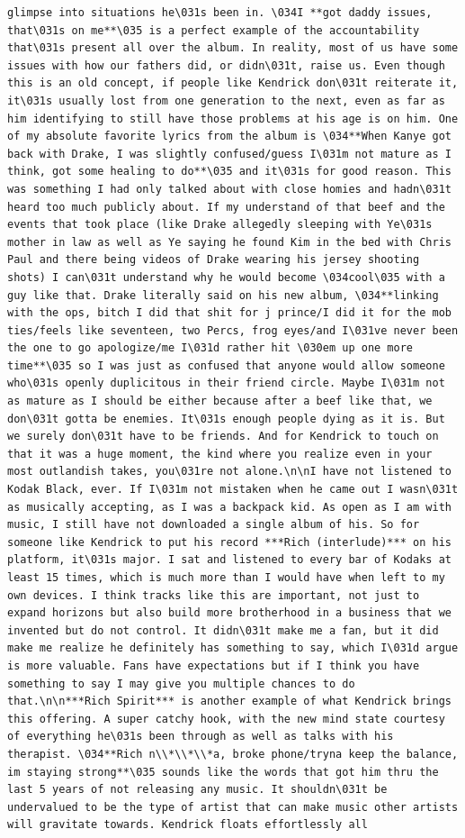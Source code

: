 \documentclass[
  letterpaper,
  DIV=11,
  numbers=noendperiod]{scrreprt}
\begin{document}
\begin{verbatim}
glimpse into situations he\031s been in. \034I **got daddy issues, that\031s on me**\035 is a perfect example of the accountability that\031s present all over the album. In reality, most of us have some issues with how our fathers did, or didn\031t, raise us. Even though this is an old concept, if people like Kendrick don\031t reiterate it, it\031s usually lost from one generation to the next, even as far as him identifying to still have those problems at his age is on him. One of my absolute favorite lyrics from the album is \034**When Kanye got back with Drake, I was slightly confused/guess I\031m not mature as I think, got some healing to do**\035 and it\031s for good reason. This was something I had only talked about with close homies and hadn\031t heard too much publicly about. If my understand of that beef and the events that took place (like Drake allegedly sleeping with Ye\031s mother in law as well as Ye saying he found Kim in the bed with Chris Paul and there being videos of Drake wearing his jersey shooting shots) I can\031t understand why he would become \034cool\035 with a guy like that. Drake literally said on his new album, \034**linking with the ops, bitch I did that shit for j prince/I did it for the mob ties/feels like seventeen, two Percs, frog eyes/and I\031ve never been the one to go apologize/me I\031d rather hit \030em up one more time**\035 so I was just as confused that anyone would allow someone who\031s openly duplicitous in their friend circle. Maybe I\031m not as mature as I should be either because after a beef like that, we don\031t gotta be enemies. It\031s enough people dying as it is. But we surely don\031t have to be friends. And for Kendrick to touch on that it was a huge moment, the kind where you realize even in your most outlandish takes, you\031re not alone.\n\nI have not listened to Kodak Black, ever. If I\031m not mistaken when he came out I wasn\031t as musically accepting, as I was a backpack kid. As open as I am with music, I still have not downloaded a single album of his. So for someone like Kendrick to put his record ***Rich (interlude)*** on his platform, it\031s major. I sat and listened to every bar of Kodaks at least 15 times, which is much more than I would have when left to my own devices. I think tracks like this are important, not just to expand horizons but also build more brotherhood in a business that we invented but do not control. It didn\031t make me a fan, but it did make me realize he definitely has something to say, which I\031d argue is more valuable. Fans have expectations but if I think you have something to say I may give you multiple chances to do that.\n\n***Rich Spirit*** is another example of what Kendrick brings this offering. A super catchy hook, with the new mind state courtesy of everything he\031s been through as well as talks with his therapist. \034**Rich n\\*\\*\\*a, broke phone/tryna keep the balance, im staying strong**\035 sounds like the words that got him thru the last 5 years of not releasing any music. It shouldn\031t be undervalued to be the type of artist that can make music other artists will gravitate towards. Kendrick floats effortlessly all 
\end{verbatim}
\end{document}
